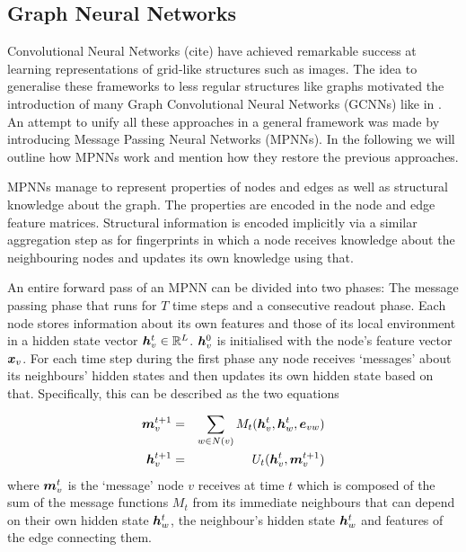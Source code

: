 \subsection{Graph Neural Networks}
\label{sec:GNN}

Convolutional Neural Networks (cite) have achieved remarkable success at learning representations of grid-like structures such as images. The idea to generalise these frameworks to less regular structures like graphs motivated the introduction of many Graph Convolutional Neural Networks (GCNNs) like in \citep{li2015gated,duvenaud2015convolutional,Kearnes_2016, Sch_tt_2017}. An attempt to unify all these approaches in a general framework was made by \cite{GilmerSRVD17} introducing Message Passing Neural Networks (MPNNs). In the following we will outline how MPNNs work and mention how they restore the previous approaches. 

MPNNs manage to represent properties of nodes and edges as well as structural knowledge about the graph. The properties are encoded in the node and edge feature matrices. Structural information is encoded implicitly via a similar aggregation step as for fingerprints in which a node receives knowledge about the neighbouring nodes and updates its own knowledge using that.

An entire forward pass of an MPNN can be divided into two phases: The message passing phase that runs for $T$ time steps and a consecutive readout phase. Each node stores information about its own features and those of its local environment in a hidden state vector ${\boldsymbol h}_v^t \in {\mathbb{R}}^L$.  $\boldsymbol h_v^0$ is initialised with the node's feature vector $\boldsymbol x_v$. For each time step during the first phase any node receives `messages' about its neighbours' hidden states and then updates its own hidden state based on that. Specifically, this can be described as the two equations

\begin{eqnarray}
\boldsymbol m_v^{t+1} & =& \sum_{w\in N(v)} M_t(\boldsymbol h_v^t, \boldsymbol h_w^t, \boldsymbol e_{vw}) \label{eq:message_passing} \\
\boldsymbol h_v^{t+1} & =& U_t(\boldsymbol h_v^t, \boldsymbol m_v^{t+1})\label{eq:updating}
\end{eqnarray}
where $\boldsymbol m_v^t$ is the `message' node $v$ receives at time $t$ which is composed of the sum of the message functions $M_t$ from its immediate neighbours that can depend on their own hidden state $\boldsymbol h_w^t$, the neighbour's hidden state $\boldsymbol h_w^t$ and features of the edge connecting them.

